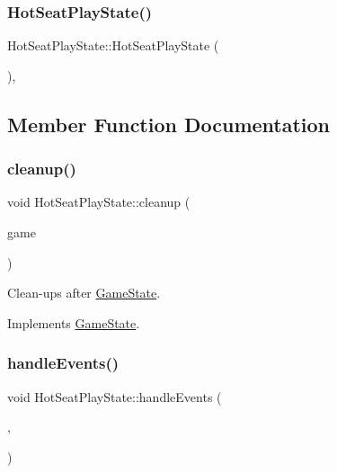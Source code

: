 \subsubsection{\texorpdfstring{HotSeatPlayState()}{HotSeatPlayState()}}
{\footnotesize\ttfamily Hot\+Seat\+Play\+State\+::\+Hot\+Seat\+Play\+State (\begin{DoxyParamCaption}{ }\end{DoxyParamCaption})\hspace{0.3cm}{\ttfamily [inline]}, {\ttfamily [protected]}}



\subsection{Member Function Documentation}
\mbox{\label{class_hot_seat_play_state_ae9ca450fc070526a0ee329002e4308f2}} 
\subsubsection{\texorpdfstring{cleanup()}{cleanup()}}
{\footnotesize\ttfamily void Hot\+Seat\+Play\+State\+::cleanup (\begin{DoxyParamCaption}\item[{\mbox{\hyperlink{class_game_engine}{Game\+Engine}} $\ast$}]{game }\end{DoxyParamCaption})\hspace{0.3cm}{\ttfamily [virtual]}}



Clean-\/ups after \mbox{\hyperlink{class_game_state}{Game\+State}}. 



Implements \mbox{\hyperlink{class_game_state_a7df4ea0b4815d2b3b35dbec2a399a0b6}{Game\+State}}.

\mbox{\label{class_hot_seat_play_state_a92606c5f4b8106b4fec1482a75be3c8d}} 
\subsubsection{\texorpdfstring{handleEvents()}{handleEvents()}}
{\footnotesize\ttfamily void Hot\+Seat\+Play\+State\+::handle\+Events (\begin{DoxyParamCaption}\item[{\mbox{\hyperlink{class_game_engine}{Game\+Engine}} $\ast$}]{,  }\item[{sf\+::\+Event}]{ }\end{DoxyParamCaption})\hspace{0.3cm}{\ttfamily [virtual]}}



